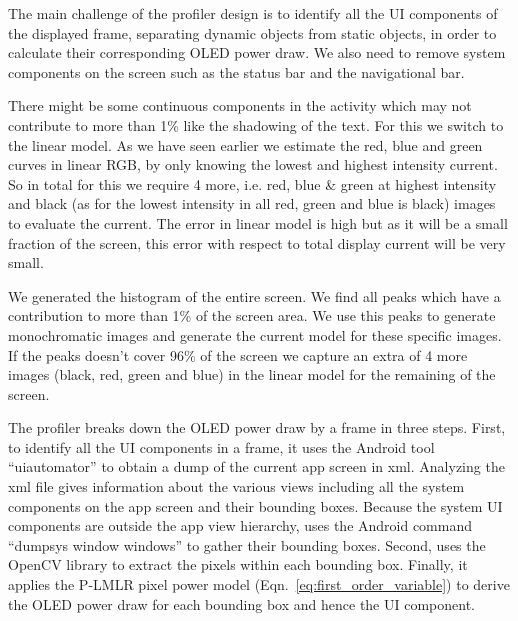 
The main challenge of the \name profiler design is to identify all the UI
components of the displayed frame, \eg separating dynamic objects from
static objects, in order to calculate their corresponding OLED power
draw.
% 
We also need to remove system components on the screen such as the
status bar and the navigational bar.


There might be some continuous components in the activity which may not contribute
to more than 1\% like the shadowing of the text. For this we switch to the linear model.
As we have seen earlier we estimate the red, blue and green curves in linear RGB,
by only knowing the lowest and highest intensity current. So in total for this we
require 4 more, i.e. red, blue \& green at highest intensity and black
(as for the lowest intensity in all red, green and blue is black) images to evaluate the current.
The error in linear model is high but as it will be a small fraction of the screen,
this error with respect to total display current will be very small.
\fi

We generated the histogram of the entire screen. We find all peaks
which have a contribution to more than 1\% of the screen area.  We use
this peaks to generate monochromatic images and generate the current
model for these specific images.  If the peaks doesn't cover 96\% of
the screen we capture an extra of 4 more images (black, red, green and
blue) in the linear model for the remaining of the screen.
\fi


The \name profiler breaks down the OLED power draw by a frame in three steps.
First, to identify all the UI
components in a frame, it uses the Android tool ``uiautomator'' to
obtain a dump of the current app screen in xml. {Analyzing the xml
  file gives information about the various views including all the
  system components on the app screen and their bounding boxes.}
Because the system UI components are outside the app view hierarchy,
\name uses the Android command ``dumpsys window windows'' to gather their
bounding boxes.  Second, \name uses the OpenCV library to extract the
pixels within each bounding box.  Finally, it applies the P-LMLR pixel
power model (Eqn.~\ref{eq:first_order_variable}) to derive the OLED power draw for each bounding box and
hence the UI component.



